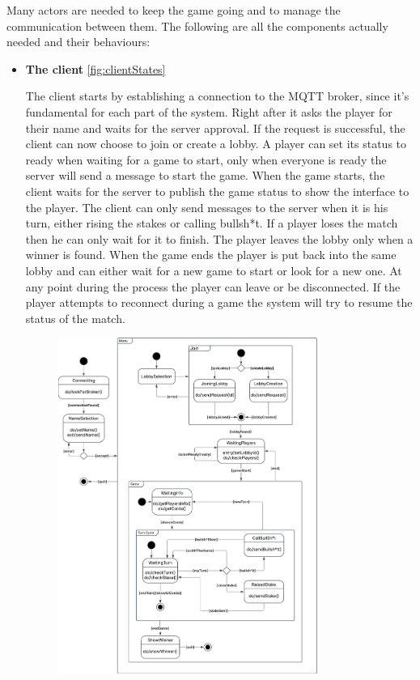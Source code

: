 \documentclass{scrartcl}
\begin{document}
Many actors are needed to keep the game going and to manage the communication between them. \newline
The following are all the components actually needed and their behaviours:
\begin{itemize}
    \item
          \textbf{The client} \cref{fig:clientStates} \par
          The client starts by establishing a connection to the MQTT broker, since it's fundamental
          for each part of the system. \newline
          Right after it asks the player for their name and waits for the server approval.
          If the request is successful, the client can now choose to join or create a lobby. \newline
          A player can set its status to ready when waiting for a game to start, only when everyone is ready
          the server will send a message to start the game. \newline
          When the game starts, the client waits for the server to publish the game status to 
          show the interface to the player.
          The client can only send messages to the server when it is his turn, either rising the stakes
          or calling bullsh*t. If a player loses the match then he can only wait for it to finish.
          The player leaves the lobby only when a winner is found. When the game ends the
          player is put back into the same lobby and can either wait for a new game to start or look for a new one. \newline
          At any point during the process the player can leave or be disconnected.
          If the player attempts to reconnect during a game the system will try to resume the status of the match.
          \begin{figure}[H]
              \centering
              \includegraphics[width=0.8\textwidth]{figures/clientStates.png}

\end{figure}
\end{itemize}
\end{document}
